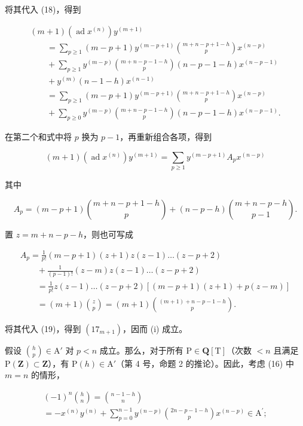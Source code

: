 将其代入 (18)，得到

\[
\begin{array}{l} (m + 1) (\operatorname{ad} x ^ {(n)}) y ^ {(m + 1)} \\ \qquad = \sum_ {p \geq 1} (m - p + 1) y ^ {(m - p + 1)} \binom {m + n - p + 1 - h} {p} x ^ {(n - p)} \\ \qquad + \sum_ {p \geq 1} y ^ {(m - p)} \binom {m + n - p - 1 - h} {p} (n - p - 1 - h) x ^ {(n - p - 1)} \\ \qquad + y ^ {(m)} (n - 1 - h) x ^ {(n - 1)} \\ \qquad = \sum_ {p \geq 1} (m - p + 1) y ^ {(m - p + 1)} \binom {m + n - p + 1 - h} {p} x ^ {(n - p)} \\ \qquad + \sum_ {p \geq 0} y ^ {(m - p)} \binom {m + n - p - 1 - h} {p} (n - p - 1 - h) x ^ {(n - p - 1)}. \end{array}
\]

在第二个和式中将 \(p\) 换为 \(p - 1\)，再重新组合各项，得到

\[
(m + 1) (\operatorname{ad} x ^ {(n)}) y ^ {(m + 1)} = \sum_ {p \geq 1} y ^ {(m - p + 1)} A _ {p} x ^ {(n - p)}\tag{19}
\]

其中

\[
A _ {p} = (m - p + 1) \binom{m + n - p + 1 - h}{p} + (n - p - h) \binom{m + n - p - h}{p - 1}.
\]

置 \(z = m + n - p - h\)，则也可写成

\[
\begin{array}{l} A _ {p} = \frac {1}{p !} (m - p + 1) (z + 1) z (z - 1) \dots (z - p + 2) \\ \qquad + \frac {1}{(p - 1) !} (z - m) z (z - 1) \dots (z - p + 2) \\ \qquad = \frac {1}{p !} z (z - 1) \dots (z - p + 2) [ (m - p + 1) (z + 1) + p (z - m) ] \\ \qquad = (m + 1) \binom {z} {p} = (m + 1) \binom {(m + 1) + n - p - 1 - h} {p}. \end{array}
\]

将其代入 (19)，得到 \((17_{m + 1})\)，因而 (i) 成立。

假设 \(\binom{h}{p} \in \mathrm{A}'\) 对 \(p < n\) 成立。那么，对于所有 \(\mathrm{P} \in \mathbf{Q}[\mathrm{T}]\)（次数 \(< n\) 且满足 \(\mathrm{P}(\mathbf{Z}) \subset \mathbf{Z}\)），有 \(\mathrm{P}(h) \in \mathrm{A}'\)（第 4 号，命题 2 的推论）。因此，考虑 (16) 中 \(m = n\) 的情形，

\[
\begin{array}{c} (- 1) ^ {n} \binom{h}{n} = \binom{n - 1 - h}{n} \\ = - x ^ {(n)} y ^ {(n)} + \sum_ {p = 0} ^ {n - 1} y ^ {(n - p)} \binom{2 n - p - 1 - h}{p} x ^ {(n - p)} \in \mathrm{A} ^ {\prime}; \end{array}
\]

